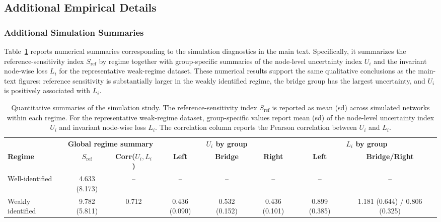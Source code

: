 \documentclass[12pt]{article}
\begin{document}
\newpage
\subsection*{Additional Empirical Details}

\subsubsection*{Additional Simulation Summaries}

Table~\ref{tab:sim-summary} reports numerical summaries corresponding to the simulation
diagnostics in the main text. Specifically, it summarizes the reference-sensitivity index
$S_{\mathrm{ref}}$ by regime together with group-specific summaries of the node-level uncertainty
index $U_i$ and the invariant node-wise loss $L_i$ for the representative weak-regime dataset.
These numerical results support the same qualitative conclusions as the main-text figures:
reference sensitivity is substantially larger in the weakly identified regime, the bridge group has
the largest uncertainty, and $U_i$ is positively associated with $L_i$.

\begin{landscape}
	\begin{table}[p]
		\centering
		\small
		\begin{tabular}{lccccccc}
			\toprule
			& \multicolumn{2}{c}{\textbf{Global regime summary}} & \multicolumn{3}{c}{\textbf{$U_i$ by group}} & \multicolumn{2}{c}{\textbf{$L_i$ by group}} \\
			\cmidrule(lr){2-3}\cmidrule(lr){4-6}\cmidrule(lr){7-8}
			\textbf{Regime} & \textbf{$S_{\mathrm{ref}}$} & \textbf{Corr($U_i,L_i$)} & \textbf{Left} & \textbf{Bridge} & \textbf{Right} & \textbf{Left} & \textbf{Bridge/Right} \\
			\midrule
			Well-identified
			& 4.633 (8.173)
			& --
			& --
			& --
			& --
			& --
			& -- \\
			Weakly identified
			& 9.782 (5.811)
			& 0.712
			& 0.436 (0.090)
			& 0.532 (0.152)
			& 0.436 (0.101)
			& 0.899 (0.385)
			& 1.181 (0.644) / 0.806 (0.325) \\
			\bottomrule
		\end{tabular}
		\caption{Quantitative summaries of the simulation study. The reference-sensitivity index
			$S_{\mathrm{ref}}$ is reported as mean (sd) across simulated networks within each regime. For the
			representative weak-regime dataset, group-specific values report mean (sd) of the node-level
			uncertainty index $U_i$ and invariant node-wise loss $L_i$. The correlation column reports the
			Pearson correlation between $U_i$ and $L_i$.}
		\label{tab:sim-summary}
	\end{table}
\end{landscape}
\end{document}

